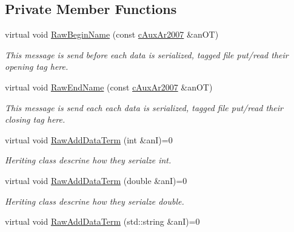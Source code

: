 \subsection*{Private Member Functions}
\begin{DoxyCompactItemize}
\item 
virtual void \hyperlink{classMMVII_1_1cAr2007_af027bf8bb18223a623e9f2bdf942e3ab}{Raw\+Begin\+Name} (const \hyperlink{classMMVII_1_1cAuxAr2007}{c\+Aux\+Ar2007} \&an\+OT)\hypertarget{classMMVII_1_1cAr2007_af027bf8bb18223a623e9f2bdf942e3ab}{}\label{classMMVII_1_1cAr2007_af027bf8bb18223a623e9f2bdf942e3ab}

\begin{DoxyCompactList}\small\item\em This message is send before each data is serialized, tagged file put/read their opening tag here. \end{DoxyCompactList}\item 
virtual void \hyperlink{classMMVII_1_1cAr2007_aac0792943450de4e685203fc017663bb}{Raw\+End\+Name} (const \hyperlink{classMMVII_1_1cAuxAr2007}{c\+Aux\+Ar2007} \&an\+OT)\hypertarget{classMMVII_1_1cAr2007_aac0792943450de4e685203fc017663bb}{}\label{classMMVII_1_1cAr2007_aac0792943450de4e685203fc017663bb}

\begin{DoxyCompactList}\small\item\em This message is send each each data is serialized, tagged file put/read their closing tag here. \end{DoxyCompactList}\item 
virtual void \hyperlink{classMMVII_1_1cAr2007_ac00df7fc5681c05628dabeff6ebe8dc7}{Raw\+Add\+Data\+Term} (int \&anI)=0\hypertarget{classMMVII_1_1cAr2007_ac00df7fc5681c05628dabeff6ebe8dc7}{}\label{classMMVII_1_1cAr2007_ac00df7fc5681c05628dabeff6ebe8dc7}

\begin{DoxyCompactList}\small\item\em Heriting class descrine how they serialze int. \end{DoxyCompactList}\item 
virtual void \hyperlink{classMMVII_1_1cAr2007_a98bf6d54618db979c9e519a168d290ed}{Raw\+Add\+Data\+Term} (double \&anI)=0\hypertarget{classMMVII_1_1cAr2007_a98bf6d54618db979c9e519a168d290ed}{}\label{classMMVII_1_1cAr2007_a98bf6d54618db979c9e519a168d290ed}

\begin{DoxyCompactList}\small\item\em Heriting class descrine how they serialze double. \end{DoxyCompactList}\item 
virtual void \hyperlink{classMMVII_1_1cAr2007_afec5381416506ee22083a788ee51a710}{Raw\+Add\+Data\+Term} (std\+::string \&anI)=0\hypertarget{classMMVII_1_1cAr2007_afec5381416506ee22083a788ee51a710}{}\label{classMMVII_1_1cAr2007_afec5381416506ee22083a788ee51a710}


\end{DoxyCompactItemize}
